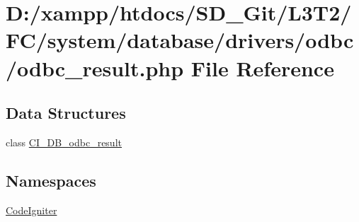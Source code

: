 \hypertarget{system_2database_2drivers_2odbc_2odbc__result_8php}{}\section{D\+:/xampp/htdocs/\+S\+D\+\_\+\+Git/\+L3\+T2/\+F\+C/system/database/drivers/odbc/odbc\+\_\+result.php File Reference}
\label{system_2database_2drivers_2odbc_2odbc__result_8php}
\subsection*{Data Structures}
\begin{DoxyCompactItemize}
\item 
class \hyperlink{class_c_i___d_b__odbc__result}{C\+I\+\_\+\+D\+B\+\_\+odbc\+\_\+result}
\end{DoxyCompactItemize}
\subsection*{Namespaces}
\begin{DoxyCompactItemize}
\item 
 \hyperlink{namespace_code_igniter}{Code\+Igniter}
\end{DoxyCompactItemize}
